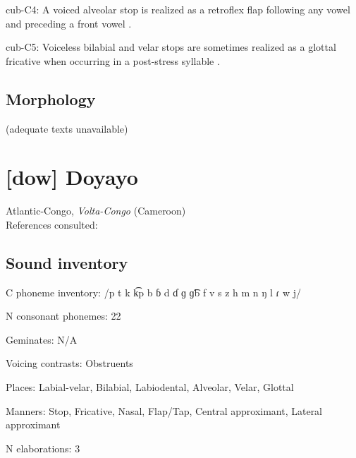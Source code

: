 {\begin{appendixdesc}
\item[cub-C4:] A voiced alveolar stop is realized as a retroflex flap following any vowel and preceding a front vowel \citep[6]{Chacon2012}.

\item[cub-C5:] Voiceless bilabial and velar stops are sometimes realized as a glottal fricative when occurring in a post-stress syllable \citep[123]{Chacon2012}.
\end{appendixdesc}
\subsection*{Morphology}

(adequate texts unavailable)
\section*{[dow] Doyayo}  %
Atlantic-Congo, \textit{Volta-Congo} (Cameroon)\medskip\\
References consulted: \citet{WieringWiering1994}

\subsection*{Sound inventory}
\begin{appendixdesc}

\item[C phoneme inventory:] /p t k k͡p b ɓ d ɗ ɡ ɡ͡b f v s z h m n ŋ l ɾ w j/

\item[N consonant phonemes:] 22

\item[Geminates:] N/A

\item[Voicing contrasts:] Obstruents

\item[Places:] Labial-velar, Bilabial, Labiodental, Alveolar, Velar, Glottal

\item[Manners:] Stop, Fricative, Nasal, Flap/Tap, Central approximant, Lateral approximant

\item[N elaborations:] 3


\end{appendixdesc}}
